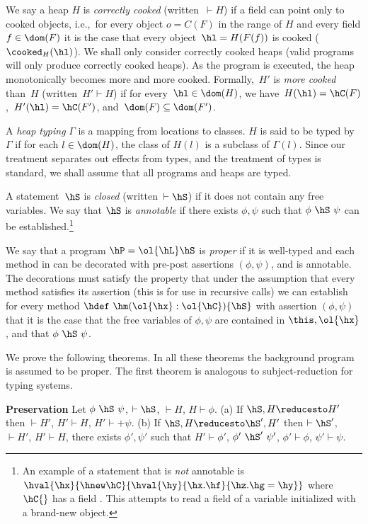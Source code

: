 
We say a heap $H$ is {\em correctly cooked} (written~$\vdash H$)
    if a field can point only to cooked objects, i.e.,~for every object $o=C(F)$ in the range of $H$ and
    every field $f \in \dom(F)$ it is the case that every object~$\hl=H(F(f))$ is cooked ($\cooked_H(\hl)$).
We shall only consider correctly cooked heaps (valid
programs will only produce correctly cooked heaps).
As the program is executed, the heap monotonically becomes more and more cooked.
Formally,~$H'$ is \emph{more cooked} than~$H$ (written~$H' \vdash H$)
    if for every~$\hl \in \dom(H)$, we have~$H(\hl)=\hC(F)$,~$H'(\hl)=\hC(F')$, and~$\dom(F)\subseteq\dom(F')$.

A {\em heap typing} $\Gamma$ is a mapping from locations to classes. $H$ is
said to be typed by $\Gamma$ if for each $l\in\dom(H)$, the class of $H(l)$
is a subclass of $\Gamma(l)$.  Since our treatment separates out effects
from types, and the treatment of types is standard, we shall assume
that all programs and heaps are typed.

A statement~$\hS$ is \emph{closed} (written~$\vdash \hS$) if it does not contain any free variables.
We say that $\hS$ is \emph{annotable} if there exists $\phi,\psi$ such that
$\phi~\hS~\psi$ can be established.\footnote{An example of a statement that is
{\em not} annotable is $\hval{\hx}{\hnew
  \hC}{\hval{\hy}{\hx.\hf}{\hz.\hg=\hy}}$ where $\hC{}$ has a field
\hf. This attempts to read a field of a variable initialized with a
brand-new object.}

We say that a program $\hP=\ol{\hL}\hS$ is {\em proper} if it is
well-typed and each method in \hL{} can be decorated with pre-post assertions
$(\phi,\psi)$, and \hS is annotable.
The decorations must satisfy the property that under the
assumption that every method satisfies its assertion (this is for use
in recursive calls) we can establish for every method
$\hdef~\hm(\ol{\hx}:\ol{\hC})\{\hS\}$ with assertion $(\phi,\psi)$ that
it is the case that the free variables of $\phi,\psi$ are contained in
$\this,\ol{\hx}$, and that $\phi~\hS~\psi$.

We prove the following theorems. In all these theorems the background
program \hP{} is assumed to be proper. The first theorem is analogous
to subject-reduction for typing systems.
\begin{Theorem}{\textbf{Preservation}}
Let $\phi~\hS~\psi$, $\vdash \hS$, $\vdash H$, $H \vdash \phi$.
(a) If $\hS,H \reducesto H'$ then $\vdash H'$, $H' \vdash H$, $H' \vdash +\psi$.
(b) If $\hS,H \reducesto \hS',H'$ then $\vdash \hS'$, $\vdash H'$, $H' \vdash H$,
there exists $\phi',\psi'$ such
that $H' \vdash \phi'$, $\phi'~\hS'~\psi'$, $\phi' \vdash \phi$, $\psi' \vdash \psi$.
\end{Theorem}

